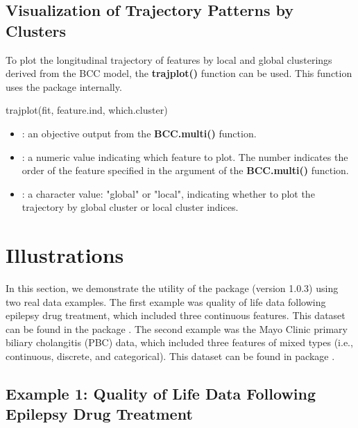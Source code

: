 \subsection{Visualization of Trajectory Patterns by Clusters}

To plot the longitudinal trajectory of features by local and global clusterings derived from the BCC model, the \textbf{trajplot()} function can be used. This function uses the  package internally. 

\begin{example}

trajplot(fit, feature.ind, which.cluster)

\end{example}

\begin{itemize}

	\item {}: an objective output from the \textbf{BCC.multi()} function.  

	\item {}: a numeric value indicating which feature to plot. The number indicates the order of the feature specified in the  argument of the \textbf{BCC.multi()} function.

	\item {}:  a character value: "global" or "local", indicating whether to plot the trajectory by global cluster or local cluster indices. 

\end{itemize}

\section{Illustrations} \label{sec:illustrations}

In this section, we demonstrate the utility of the  package (version 1.0.3) using two real data examples. The first example was quality of life data following epilepsy drug treatment, which included three continuous features. This dataset can be found in the  package \citep{Hickey2018}. The second example was the Mayo Clinic primary biliary cholangitis (PBC) data, which included three features of mixed types (i.e., continuous, discrete, and categorical).  This dataset can be found in  package \citep{Komarek2014}.

\subsection{Example 1: Quality of Life Data Following Epilepsy Drug Treatment}

